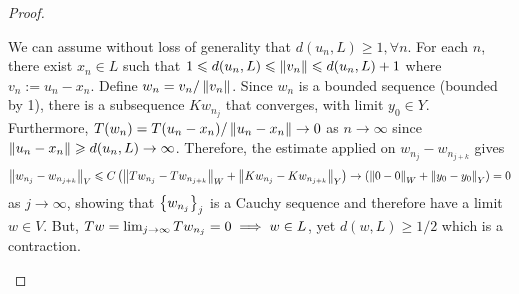 \documentclass{article}
\begin{document}
\begin{ftheorem}
\begin{proof}
\begin{case} We can assume without loss of generality that $d(u_n, L) \geq 1, \forall n$. For each $n$, there exist $x_n \in L$ such that $1 \leq d(u_n, L) \leq \norm[v_n] \leq d(u_n, L) + 1$ where $v_n := u_n - x_n$. Define $w_n = v_n / \norm[v_n]$. Since $w_n$ is a bounded sequence (bounded by 1), there is a subsequence $Kw_{n_j}$ that converges, with limit $y_0 \in Y$. Furthermore, $T(w_n) = T(u_n - x_n) / \norm[u_n - x_n] \to 0$ as $n \to \infty$ since $\norm[u_n - x_n] \geq d(u_n, L) \to \infty$. Therefore, the estimate applied on $w_{n_j} - w_{n_{j + k}}$ gives
\begin{align*}
\norm[w_{n_j} - w_{n_{j + k}}]_V \leq C \brac{\norm[Tw_{n_j} - Tw_{n_{j + k}}]_W + \norm[Kw_{n_j} - Kw_{n_{j + k}}]_Y} \to  \brac{\norm[0 - 0]_W + \norm[y_0 - y_0]_Y} = 0 
\end{align*}
as $j \to \infty$, showing that $\set{w_{n_j}}_j$ is a Cauchy sequence and therefore have a limit $w \in V$. But, $Tw = \Lim[j] Tw_{n_j} = 0 \implies w \in L$, yet $d(w, L) \geq 1/2$ which is a contraction. 
\end{case}




\end{proof}
\end{ftheorem}





\end{document}
